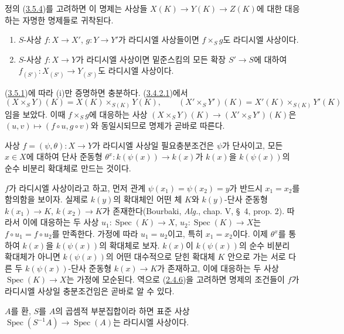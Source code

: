 정의 (\hyperref[I.3.5.4-ko]{3.5.4})를 고려하면 이 명제는 사상들
$X(K)\to Y(K)\to Z(K)$에 대한 대응하는 자명한 명제들로 귀착된다.

\begin{proposition}[3.5.7]
\label{I.3.5.7-ko}
\begin{enumerate}
  \item[(i)] $S$-사상 $f:X\to X'$, $g:Y\to Y'$가 라디시엘
  사상들이면 $f\times_S g$도 라디시엘 사상이다.
  \item[(ii)] $S$-사상 $f:X\to Y$가 라디시엘 사상이면 밑준스킴의
  모든 확장 $S'\to S$에 대하여
  $f_{(S')}:X_{(S')}\to Y_{(S')}$도 라디시엘 사상이다.
\end{enumerate}
\end{proposition}

(\hyperref[I.3.5.1-ko]{3.5.1})에 따라 (i)만 증명하면 충분하다.
(\hyperref[I.3.4.2.1-ko]{3.4.2.1})에서
\label{I.3.5.7.field-valued-product-ko}
\[
  (X\times_S Y)(K)=X(K)\times_{S(K)}Y(K),\qquad
  (X'\times_S Y')(K)=X'(K)\times_{S(K)}Y'(K)
\]
임을 보았다. 이때 $f\times_S g$에 대응하는 사상
$(X\times_S Y)(K)\to(X'\times_S Y')(K)$은
$(u,v)\mapsto(f\circ u,g\circ v)$와 동일시되므로 명제가 곧바로
따른다.

\begin{proposition}[3.5.8]
\label{I.3.5.8-ko}
사상 $f=(\psi,\theta):X\to Y$가 라디시엘 사상일 필요충분조건은
$\psi$가 단사이고, 모든 $x\in X$에 대하여 단사 준동형
$\theta^x:k(\psi(x))\to k(x)$가 $k(x)$을 $k(\psi(x))$의 순수 비분리
확대체로 만드는 것이다.
\end{proposition}

$f$가 라디시엘 사상이라고 하고, 먼저 관계
$\psi(x_1)=\psi(x_2)=y$가 반드시 $x_1=x_2$를 함의함을 보이자.
실제로 $k(y)$의 확대체인 어떤 체 $K$와 $k(y)$-단사 준동형
$k(x_1)\to K$, $k(x_2)\to K$가 존재한다(Bourbaki, \emph{Alg.},
chap. V, \S~4, prop. 2). 따라서 이에 대응하는 두 사상
$u_1:\operatorname{Spec}(K)\to X$,
$u_2:\operatorname{Spec}(K)\to X$는 $f\circ u_1=f\circ u_2$를
만족한다. 가정에 따라 $u_1=u_2$이고, 특히 $x_1=x_2$이다. 이제
$\theta^x$를 통하여 $k(x)$을 $k(\psi(x))$의 확대체로 보자. $k(x)$이
$k(\psi(x))$의 순수 비분리 확대체가 아니면 $k(\psi(x))$의 어떤
대수적으로 닫힌 확대체 $K$ 안으로 가는 서로 다른 두
$k(\psi(x))$-단사 준동형 $k(x)\to K$가 존재하고, 이에 대응하는 두
사상 $\operatorname{Spec}(K)\to X$는 가정에 모순된다. 역으로
(\hyperref[I.2.4.6-ko]{2.4.6})을 고려하면 명제의 조건들이 $f$가
라디시엘 사상일 충분조건임은 곧바로 알 수 있다.

\begin{corollary}[3.5.9]
\label{I.3.5.9-ko}
$A$를 환, $S$를 $A$의 곱셈적 부분집합이라 하면 표준 사상
$\operatorname{Spec}(S^{-1}A)\to\operatorname{Spec}(A)$는 라디시엘
사상이다.
\end{corollary}

